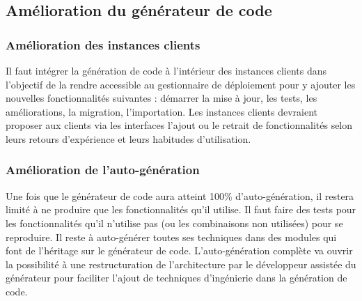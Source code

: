 \subsection{Amélioration du générateur de code}

\subsubsection{Amélioration des instances clients}

Il faut intégrer la génération de code à l’intérieur des instances clients dans l’objectif de la rendre accessible au gestionnaire de déploiement pour y ajouter les nouvelles fonctionnalités suivantes : démarrer la mise à jour, les tests, les améliorations, la migration, l'importation. Les instances clients devraient proposer aux clients via les interfaces l'ajout ou le retrait de fonctionnalités selon leurs retours d'expérience et leurs habitudes d'utilisation.




\subsubsection{Amélioration de l'auto-génération}

Une fois que le générateur de code aura atteint 100\% d’auto-génération, il restera limité à ne produire que les fonctionnalités qu’il utilise. Il faut faire des tests pour les fonctionnalités qu’il n’utilise pas (ou les combinaisons non utilisées) pour se reproduire. Il reste à auto-générer toutes ses techniques dans des modules qui font de l'héritage sur le générateur de code. L'auto-génération complète va ouvrir la possibilité à une restructuration de l'architecture par le développeur assistée du générateur pour faciliter l'ajout de techniques d'ingénierie dans la génération de code.


